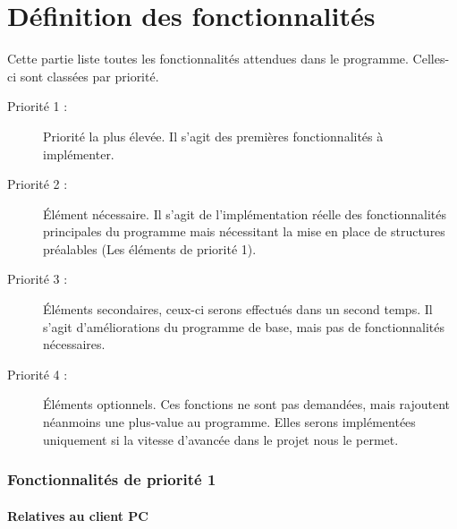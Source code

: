 \part{Définition des fonctionnalités}
Cette partie liste toutes les fonctionnalités attendues dans le programme. Celles-ci sont classées par priorité.

\begin{description}
\item [Priorité 1 :]
	Priorité la plus élevée. Il s'agit des premières fonctionnalités à implémenter.

\item [Priorité 2 :]
	Élément nécessaire. Il s'agit de l'implémentation réelle des fonctionnalités principales du programme mais nécessitant la mise en place de structures préalables (Les éléments de priorité 1). 

\item [Priorité 3 :]
	Éléments secondaires, ceux-ci serons effectués dans un second temps. Il s'agit d'améliorations du programme de base, mais pas de fonctionnalités nécessaires.  

\item [Priorité 4 :]
	Éléments optionnels. Ces fonctions ne sont pas demandées, mais rajoutent néanmoins une plus-value au programme. Elles serons implémentées uniquement si la vitesse d'avancée dans le projet nous le permet.
\end{description}


\section{Fonctionnalités de priorité 1}


\subsection{Relatives au client PC}


